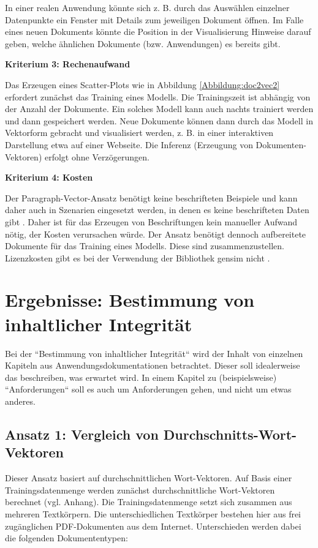 In einer realen Anwendung könnte sich z. B. durch das Auswählen einzelner Datenpunkte ein Fenster mit Details zum jeweiligen Dokument öffnen. Im Falle eines neuen Dokuments könnte die Position in der Visualisierung Hinweise darauf geben, welche ähnlichen Dokumente (bzw. Anwendungen) es bereits gibt. 



{\bf Kriterium 3: Rechenaufwand}

Das Erzeugen eines Scatter-Plots wie in Abbildung \ref{Abbildung:doc2vec2} erfordert zunächst das Training eines Modells. Die Trainingszeit ist abhängig von der Anzahl der Dokumente. Ein solches Modell kann auch nachts trainiert werden und dann gespeichert werden. Neue Dokumente können dann durch das Modell in Vektorform gebracht und visualisiert werden, z. B. in einer interaktiven Darstellung etwa auf einer Webseite. Die Inferenz (Erzeugung von Dokumenten-Vektoren) erfolgt ohne Verzögerungen.

{\bf Kriterium 4: Kosten}

Der Paragraph-Vector-Ansatz benötigt keine beschrifteten Beispiele und kann daher auch in Szenarien eingesetzt werden, in denen es keine beschrifteten Daten gibt \cite[S. 4]{mikolov2014}. Daher ist für das Erzeugen von Beschriftungen kein manueller Aufwand nötig, der Kosten verursachen würde. Der Ansatz benötigt dennoch aufbereitete Dokumente für das Training eines Modells. Diese sind zusammenzustellen. Lizenzkosten gibt es bei der Verwendung der Bibliothek gensim nicht \cite{gensim-license}.

\section{Ergebnisse: Bestimmung von inhaltlicher Integrität}

Bei der ``Bestimmung von inhaltlicher Integrität`` wird der Inhalt von einzelnen Kapiteln aus Anwendungsdokumentationen betrachtet. Dieser soll idealerweise das beschreiben, was erwartet wird. In einem Kapitel zu (beispielsweise) ``Anforderungen`` soll es auch um Anforderungen gehen, und nicht um etwas anderes.

\subsection{Ansatz 1: Vergleich von Durchschnitts-Wort-Vektoren}

Dieser Ansatz basiert auf durchschnittlichen Wort-Vektoren. Auf Basis einer Trainingsdatenmenge werden zunächst durchschnittliche Wort-Vektoren berechnet (vgl. Anhang). Die Trainingsdatenmenge setzt sich zusammen aus mehreren Textkörpern. Die unterschiedlichen Textkörper bestehen hier aus frei zugänglichen PDF-Dokumenten aus dem Internet. Unterschieden werden dabei die folgenden Dokumententypen:

